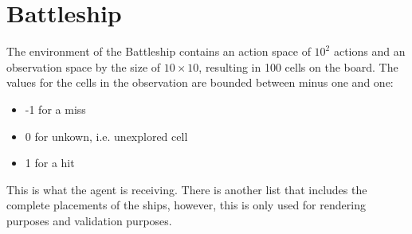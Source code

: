 \section{Battleship}
\label{sec:ex_battleship}
The environment of the Battleship contains an action space of $10^2$ actions and an observation space by the size of $10 \times 10$, resulting in 100 cells on the board. The values for the cells in the observation are bounded between minus one and one: 

\begin{itemize}

	\item{-1 for a miss}
	\item{0 for unkown, i.e. unexplored cell}
	\item{1 for a hit}

\end{itemize}
This is what the agent is receiving. There is another list that includes the complete placements of the ships, however, this is only used for rendering purposes and validation purposes. 
